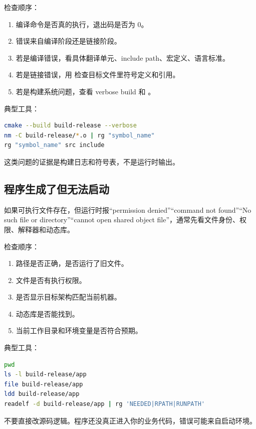 检查顺序：

\begin{enumerate}
  \item 编译命令是否真的执行，退出码是否为 0。
  \item 错误来自编译阶段还是链接阶段。
  \item 若是编译错误，看具体翻译单元、include path、宏定义、语言标准。
  \item 若是链接错误，用  检查目标文件里符号定义和引用。
  \item 若是构建系统问题，查看 verbose build 和 。
\end{enumerate}

典型工具：

\begin{lstlisting}[language=bash]
cmake --build build-release --verbose
nm -C build-release/*.o | rg "symbol_name"
rg "symbol_name" src include
\end{lstlisting}

这类问题的证据是构建日志和符号表，不是运行时输出。

\subsection{程序生成了但无法启动}

如果可执行文件存在，但运行时报“permission denied”“command not found”“No such file or directory”“cannot open shared object file”，通常先看文件身份、权限、解释器和动态库。

检查顺序：

\begin{enumerate}
  \item 路径是否正确，是否运行了旧文件。
  \item 文件是否有执行权限。
  \item {} 是否显示目标架构匹配当前机器。
  \item 动态库是否能找到。
  \item 当前工作目录和环境变量是否符合预期。
\end{enumerate}

典型工具：

\begin{lstlisting}[language=bash]
pwd
ls -l build-release/app
file build-release/app
ldd build-release/app
readelf -d build-release/app | rg 'NEEDED|RPATH|RUNPATH'
\end{lstlisting}

不要直接改源码逻辑。程序还没真正进入你的业务代码，错误可能来自启动环境。

